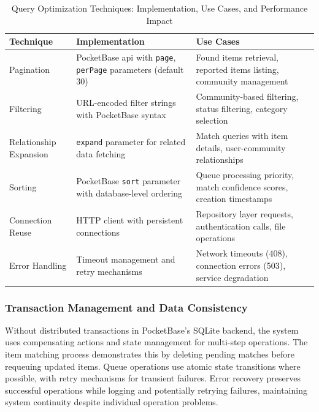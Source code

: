 \begin{table}[htbp]
    \centering
    \caption{Query Optimization Techniques: Implementation, Use Cases, and Performance Impact}
    \label{tab:query_optimization}
    \footnotesize
    \begin{tabular}{p{2.2cm}p{4.5cm}p{6cm}}
        \hline
        \textbf{Technique} & \textbf{Implementation} & \textbf{Use Cases} \\
        \hline
        Pagination & PocketBase \ac{api} with \texttt{page}, \texttt{perPage} parameters (default 30) & Found items retrieval, reported items listing, community management \\
        \hline
        Filtering & URL-encoded filter strings with PocketBase syntax & Community-based filtering, status filtering, category selection \\
        \hline
        Relationship Expansion & \texttt{expand} parameter for related data fetching & Match queries with item details, user-community relationships \\
        \hline
        Sorting & PocketBase \texttt{sort} parameter with database-level ordering & Queue processing priority, match confidence scores, creation timestamps \\
        \hline
        Connection Reuse & HTTP client with persistent connections & Repository layer requests, authentication calls, file operations \\
        \hline
        Error Handling & Timeout management and retry mechanisms & Network timeouts (408), connection errors (503), service degradation \\
        \hline
    \end{tabular}
\end{table}

\subsubsection{Transaction Management and Data Consistency}

Without distributed transactions in PocketBase's SQLite backend, the system uses compensating actions and state management for multi-step operations. The item matching process demonstrates this by deleting pending matches before requeuing updated items. Queue operations use atomic state transitions where possible, with retry mechanisms for transient failures. Error recovery preserves successful operations while logging and potentially retrying failures, maintaining system continuity despite individual operation problems.

